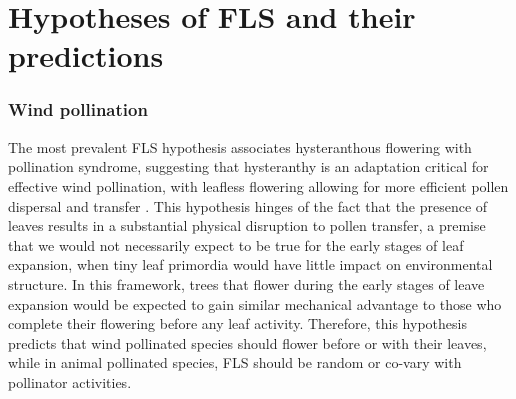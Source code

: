 \documentclass[12pt]{article}\usepackage[]{graphicx}\usepackage[]{color}
\begin{document}
\section*{Hypotheses of FLS and their predictions}
\subsubsection*{ Wind pollination}
\indent\indent The most prevalent FLS hypothesis associates hysteranthous flowering with pollination syndrome, suggesting that hysteranthy is an adaptation critical for effective wind pollination, with leafless flowering allowing for more efficient pollen dispersal and transfer \citep{Whitehead1969, Spurr1980,Friedman2009}. %
 This hypothesis hinges of the fact that the presence of leaves results in a substantial physical disruption to pollen transfer, a premise that we would not necessarily expect to be true for the early stages of leaf expansion, when tiny leaf primordia would have little impact on environmental structure. %
In this framework, trees that flower during the early stages of leave expansion would be expected to gain similar mechanical advantage to those who complete their flowering before any leaf activity. Therefore, this hypothesis predicts that wind pollinated species should flower before or with their leaves, while in animal pollinated species, FLS should be random or co-vary with pollinator activities.
\end{document}
